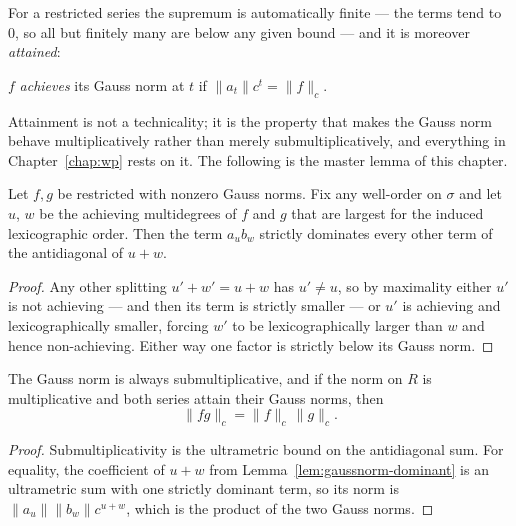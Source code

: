For a restricted series the supremum is automatically finite --- the terms tend to $0$, so all
but finitely many are below any given bound --- and it is moreover \emph{attained}:

\begin{definition}
  \label{def:achievesgaussnorm}
  \leanok
  $f$ \emph{achieves} its Gauss norm at $t$ if $\lVert a_t \rVert c^t = \lVert f \rVert_c$.
\end{definition}

Attainment is not a technicality; it is the property that makes the Gauss norm behave
multiplicatively rather than merely submultiplicatively, and everything in Chapter~\ref{chap:wp}
rests on it.  The following is the master lemma of this chapter.

\begin{lemma}
  \label{lem:gaussnorm-dominant}
  \leanok
  Let $f, g$ be restricted with nonzero Gauss norms.  Fix any well-order on $\sigma$ and let
  $u$, $w$ be the achieving multidegrees of $f$ and $g$ that are largest for the induced
  lexicographic order.  Then the term $a_u b_w$ strictly dominates every other term of the
  antidiagonal of $u + w$.
\end{lemma}

\begin{proof}
  \leanok
  Any other splitting $u' + w' = u + w$ has $u' \neq u$, so by maximality either $u'$ is not
  achieving --- and then its term is strictly smaller --- or $u'$ is achieving and
  lexicographically smaller, forcing $w'$ to be lexicographically larger than $w$ and hence
  non-achieving.  Either way one factor is strictly below its Gauss norm.
\end{proof}

\begin{theorem}
  \label{thm:gaussnorm-mul}
  \leanok
  The Gauss norm is always submultiplicative, and if the norm on $R$ is multiplicative and both
  series attain their Gauss norms, then
  \[
    \lVert fg \rVert_c = \lVert f \rVert_c \, \lVert g \rVert_c .
  \]
\end{theorem}

\begin{proof}
  \leanok
  Submultiplicativity is the ultrametric bound on the antidiagonal sum.  For equality, the
  coefficient of $u + w$ from Lemma~\ref{lem:gaussnorm-dominant} is an ultrametric sum with one
  strictly dominant term, so its norm is $\lVert a_u\rVert \lVert b_w \rVert c^{u+w}$, which is
  the product of the two Gauss norms.
\end{proof}

